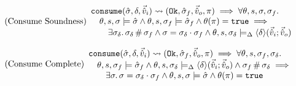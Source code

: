 %
%
%

\begin{equation}
\tag{Consume Soundness}\label{eq:consume-sound}
\begin{array}{l}
\texttt{consume}(\hat{\sigma},\delta,\vec{\hat{v}}_i)\rightsquigarrow (\texttt{Ok},\hat{\sigma}_f,\vec{\hat{v}}_o,\pi) \implies \forall \theta,s,\sigma,\sigma_f\ldotp \\
\quad  \theta,s,\sigma\models \hat{\sigma} \land \theta,s,\sigma_f\models \hat{\sigma}_f \land \theta(\pi)=\texttt{true} \implies \\
\qquad \exists \sigma_\delta\ldotp \sigma_\delta\operatorname{\#}\sigma_f \land \sigma=\sigma_\delta\cdot\sigma_f \land \theta, s, \sigma_\delta \models_{\Delta} \left<\delta\right>\!(\vec{\hat{v}}_i;\vec{\hat{v}}_o)
\end{array}
\end{equation}

\begin{equation}
\tag{Consume Complete}\label{eq:consume-complete}
\begin{array}{l}
\texttt{consume}(\hat{\sigma},\delta,\vec{\hat{v}}_i)\rightsquigarrow (\texttt{Ok},\hat{\sigma}_f,\vec{\hat{v}}_o,\pi) \implies \forall \theta,s,\sigma_f,\sigma_\delta\ldotp \\
\quad \theta,s,\sigma_f\models \hat{\sigma}_f \land \theta, s, \sigma_\delta \models_{\Delta} \left<\delta\right>\!(\vec{\hat{v}}_i;\vec{\hat{v}}_o) \land \sigma_f\operatorname{\#}\sigma_\delta \implies \\
\qquad \exists \sigma\ldotp \sigma = \sigma_\delta \cdot \sigma_f \land \theta,s,\sigma\models \hat{\sigma} \land \theta(\pi)=\texttt{true}
\end{array}
\end{equation}

